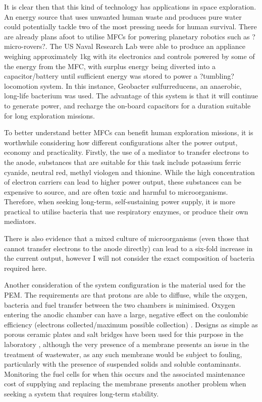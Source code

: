 \documentclass[12pt]{article}
\begin{document}
It is clear then that this kind of technology has applications in space exploration. An energy source that uses unwanted human waste and produces pure water could potentially tackle two of the most pressing needs for human survival. There are already plans afoot to utilise MFCs for powering planetary robotics such as ?micro-rovers?. The US Naval Research Lab were able to produce an appliance weighing approximately 1kg with its electronics and controls powered by some of the energy from the MFC, with surplus energy being diverted into a capacitor/battery until sufficient energy was stored to power a ?tumbling? locomotion system. In this instance, Geobacter sulfurreducens, an anaerobic, long-life bacterium was used. The advantage of this system is that it will continue to generate power, and recharge the on-board capacitors for a duration suitable for long exploration missions. \cite{society2012microbial}

To better understand better MFCs can benefit human exploration missions, it is worthwhile considering how different configurations alter the power output, economy and practicality. Firstly, the use of a mediator to transfer electrons to the anode, substances that are suitable for this task include potassium ferric cyanide, neutral red, methyl viologen and thionine. While the high concentration of electron carriers can lead to higher power output, these substances can be expensive to source, and are often toxic and harmful to microorganisms.\cite{logan2006microbial} Therefore, when seeking long-term, self-sustaining power supply, it is more practical to utilise bacteria that use respiratory enzymes, or produce their own mediators.  \cite{min2004continuous} \cite{ghangrekar2006microbial}

There is also evidence that a mixed culture of microorganisms (even those that cannot transfer electrons to the anode directly) can lead to a six-fold increase in the current output, however I will not consider the exact composition of bacteria required here.\cite{ghangrekar2006microbial}

Another consideration of the system configuration is the material used for the PEM. The requirements are that protons are able to diffuse, while the oxygen, bacteria and fuel transfer between the two chambers is minimised. Oxygen entering the anodic chamber can have a large, negative effect on the coulombic efficiency (electrons collected/maximum possible collection) \cite{logan2006microbial}.  Designs as simple as porous ceramic plates and salt bridges have been used for this purpose in the laboratory \cite{min2005electricity}, although the very presence of a membrane presents an issue in the treatment of wastewater, as any such membrane would be subject to fouling, particularly with the presence of suspended solids and soluble contaminants. Monitoring the fuel cells for when this occurs and the associated maintenance cost of supplying and replacing the membrane presents another problem when seeking a system that requires long-term stability. 
\end{document}
